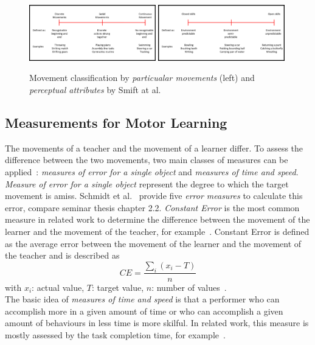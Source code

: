\begin{figure}[htb]
	\centering
	\includegraphics[width=0.49\textwidth]{figures/movement_classification.png}
	\includegraphics[width=0.49\textwidth]{figures/movement_classification2.png}
	\caption[Movement classifications by Scmidt et al.]{Movement classification by \textit{particualar movements} (left) and \textit{perceptual attributes} by Smift at al.~\cite{mlbook}}
	\label{fig:movement_classification}
\end{figure}

\subsection{Measurements for Motor Learning}
\label{section:measures_for_ml}
The movements of a teacher and the movement of a learner differ. To assess the difference between the two movements, two main classes of measures can be applied~\cite{mlbook}: \textit{measures of error for a single object} and \textit{measures of time and speed}.
\textit{Measure of error for a single object} represent the degree to which the target movement is amiss. Schmidt et al.~\cite{mlbook} provide five \textit{error measures} to calculate this error, compare seminar thesis chapter 2.2. \textit{Constant Error} is the most common measure in related work to determine the difference between the movement of the learner and the movement of the teacher, for example~\cite{perspectivematters,thaichichua,YouMove,onebody,vrdancetrainer,lightguide,physioathome}. Constant Error is defined as the average error between the movement of the learner and the movement of the teacher and is described as
\begin{equation}
	\label{eq:constanterror}
	CE=\frac{\sum_i(x_i-T)}{n}
\end{equation}
with $x_i$: actual value, $T$: target value, $n$: number of values~\cite{mlbook}.\\
The basic idea of \textit{measures of time and speed} is that a performer who can accomplish more in a given amount of time or who can accomplish a given amount of behaviours in less time is more skilful. In related work, this measure is mostly assessed by the task completion time, for example~\cite{perspectivematters,onebody,lightguide}.


